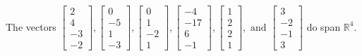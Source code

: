 \begin{exercise}
\begin{exerciseStatement}
  \end{exerciseStatement}
  \begin{exerciseAnswer}
   The vectors \(\left[\begin{array}{r}
2 \\
4 \\
-3 \\
-2
\end{array}\right] , \left[\begin{array}{r}
0 \\
-5 \\
1 \\
-3
\end{array}\right] , \left[\begin{array}{r}
0 \\
1 \\
-2 \\
1
\end{array}\right] , \left[\begin{array}{r}
-4 \\
-17 \\
6 \\
-1
\end{array}\right] , \left[\begin{array}{r}
1 \\
2 \\
2 \\
1
\end{array}\right] , \text{ and } \left[\begin{array}{r}
3 \\
-2 \\
-1 \\
3
\end{array}\right]\) 
  	 do  
	span \(\mathbb{R}^4\).
  


  \end{exerciseAnswer}
\end{exercise}
